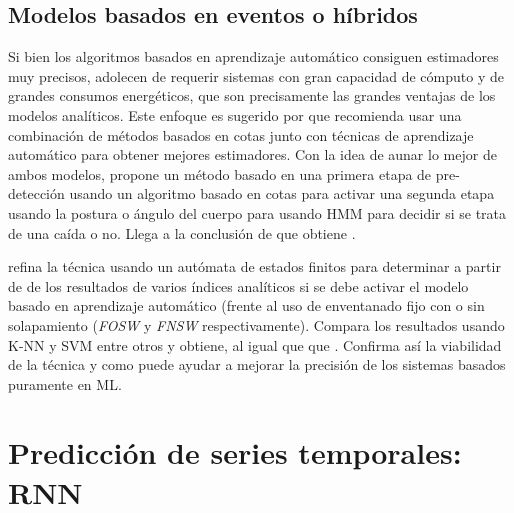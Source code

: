 \subsection{Modelos basados en eventos o híbridos}\label{sec:arte:modelos_hybridos}

Si bien los algoritmos basados en aprendizaje automático consiguen estimadores muy precisos, adolecen de requerir sistemas con gran capacidad de cómputo y de grandes consumos energéticos, que son precisamente las grandes ventajas de los modelos analíticos. Este enfoque es sugerido por \cite[p.~9]{Aziz2017b} que recomienda usar una combinación de métodos basados en cotas junto con técnicas de aprendizaje automático para obtener mejores estimadores. Con la idea de aunar lo mejor de ambos modelos,  propone un método basado en una primera etapa de pre-detección usando un algoritmo basado en cotas para activar una segunda etapa usando la postura o ángulo del cuerpo para usando HMM para decidir si se trata de una caída o no. Llega a la conclusión de que obtiene .

 refina la técnica usando un autómata de estados finitos para determinar a partir de de los resultados de varios índices analíticos si se debe activar el modelo basado en aprendizaje automático (frente al uso de enventanado fijo con o sin solapamiento (\textit{FOSW} y \textit{FNSW} respectivamente). Compara los resultados usando K-NN y SVM entre otros y obtiene, al igual que  que . Confirma así la viabilidad de la técnica y como puede ayudar a mejorar la precisión de los sistemas basados puramente en ML.


\section{Predicción de series temporales: RNN}

